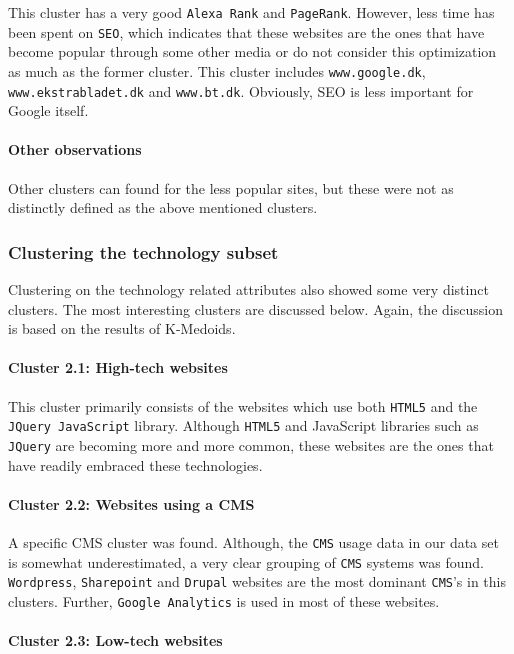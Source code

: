 This cluster has a very good \texttt{Alexa Rank} and \texttt{PageRank}. However, less time has been spent on \texttt{SEO}, which indicates that these websites are the ones that have become popular through some other media or do not consider this optimization as much as the former cluster. This cluster includes \verb|www.google.dk|, \verb|www.ekstrabladet.dk| and \verb|www.bt.dk|. Obviously, SEO is less important for Google itself.

\paragraph{Other observations} Other clusters can found for the less popular sites, but these were not as distinctly defined as the above mentioned clusters.

\subsubsection{Clustering the technology subset}

Clustering on the technology related attributes also showed some very distinct clusters. The most interesting clusters are discussed below. Again, the discussion is based on the results of K-Medoids.

\paragraph{Cluster 2.1: High-tech websites}

This cluster primarily consists of the websites which use both \texttt{HTML5} and the \texttt{JQuery JavaScript} library. Although \texttt{HTML5} and JavaScript libraries such as \texttt{JQuery} are becoming more and more common, these websites are the ones that have readily embraced these technologies.

\paragraph{Cluster 2.2: Websites using a CMS}

A specific CMS cluster was found. Although, the \texttt{CMS} usage data in our data set is somewhat underestimated, a very clear grouping of \texttt{CMS} systems was found. \texttt{Wordpress}, \texttt{Sharepoint} and \texttt{Drupal} websites are the most dominant \texttt{CMS}'s in this clusters. Further, \texttt{Google Analytics} is used in most of these websites.

\paragraph{Cluster 2.3: Low-tech websites}

